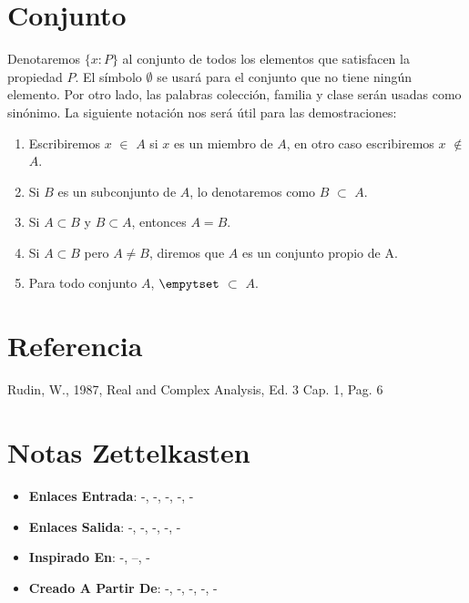 \documentclass[12pt]{article}
\begin{document}
\section*{Conjunto}

\begin{definition}
Denotaremos  $\{x : P \}$ al conjunto de todos los elementos que satisfacen la propiedad $P$. El símbolo $\emptyset$ se usará para el conjunto que no tiene ningún elemento. Por otro lado, las palabras colección, familia y clase serán usadas como sinónimo. La siguiente notación nos será útil para las demostraciones: 
\begin{enumerate}
\item Escribiremos $x$ $\in$ $A$ si $x$ es un miembro de $A$, en otro caso escribiremos $x$ $\notin$ $A$.
\item Si $B$ es un subconjunto de $A$, lo denotaremos como $B$ $\subset$ $A$.
\item Si $A \subset B$ y $B \subset A$, entonces $A  = B$.
\item Si $A \subset B$ pero $A \neq B$, diremos que $A$ es un conjunto propio de A.
\item Para todo conjunto $A$, $\empytset$ $\subset$ $A$.
\end{enumerate}
\end{definition}

\section*{Referencia}
Rudin, W., 1987, Real and Complex Analysis, Ed. 3 Cap. 1, Pag. 6 

\section*{Notas Zettelkasten}
\begin{itemize}
  \item \textbf{Enlaces Entrada}: -, -, -, -, -
  \item \textbf{Enlaces Salida}: -, -, -, -, -
  \item \textbf{Inspirado En}: -, --, -
  \item \textbf{Creado A Partir De}: -, -, -, -, -
\end{itemize}
\end{document}
